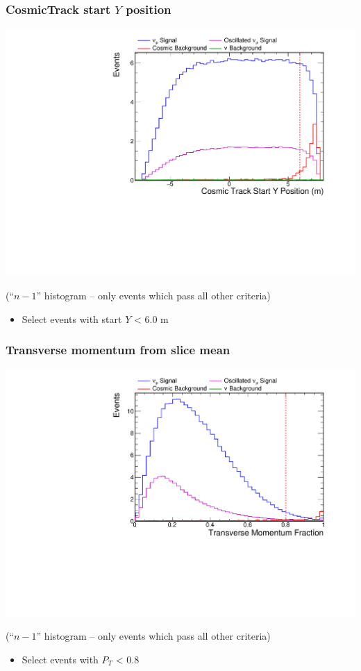 \documentclass[10pt,professionalfonts,xcolor=table]{beamer}
\begin{document}
\begin{frame}
\frametitle{CosmicTrack start $Y$ position}

  \begin{center}
  \includegraphics[height=0.7\textwidth, angle=-90]{figures/selection/n1_cosStartY.pdf}

  {\footnotesize(``$n-1$'' histogram -- only events which pass all other criteria)}
  \end{center}
  \begin{itemize}
  \item Select events with start $Y$ < 6.0 m
  \end{itemize}
\end{frame}


\begin{frame}
\frametitle{Transverse momentum from slice mean}

  \begin{center}
  \includegraphics[height=0.7\textwidth, angle=-90]{figures/selection/n1_tranMom.pdf}

  {\footnotesize(``$n-1$'' histogram -- only events which pass all other criteria)}
  \end{center}
  \begin{itemize}
  \item Select events with $P_T$ < 0.8
  \end{itemize}
\end{frame}
\end{document}
